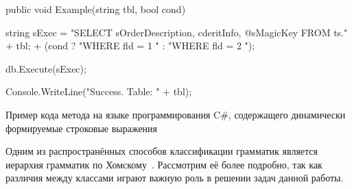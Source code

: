 \begin{listing}
    \begin{pyglist}[language=csharp,numbers=left,numbersep=5pt]

public void Example(string tbl, bool cond)
{
    string sExec =
        "SELECT sOrderDescription, cderitInfo, @sMagicKey FROM ts."
        + tbl;
        + (cond ? "WHERE fld = 1 " : "WHERE fld = 2 ");

    db.Execute(sExec);
    
    Console.WriteLine("Success. Table: " + tbl);
}
\end{pyglist}
\caption{Пример кода метода на языке программирования C\#, содержащего динамически формируемые строковые выражения}
\label{lst:stringExpr}
\end{listing}

Одним из распространённых способов классификации грамматик является иерархия грамматик по Хомскому~\cite{chomsky}. Рассмотрим её более подробно, так как различия между классами играют важную роль в решении задач данной работы.

